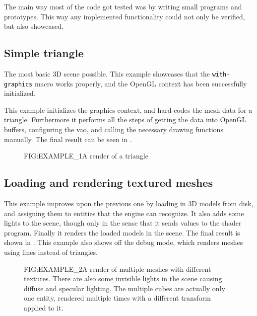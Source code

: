 

The main way most of the code got tested was by writing small programs and prototypes.
This way any implemented functionality could not only be verified,
but also showcased.

\subsection{Simple triangle}

The most basic 3D scene possible.
This example showcases that the \texttt{with-graphics} macro works properly,
and the OpenGL context has been successfully initialized.

This example initializes the graphics context,
and hard-codes the mesh data for a triangle.
Furthermore it performs all the steps of getting the data into OpenGL buffers,
configuring the \ac{vao},
and calling the necessary drawing functions manually.
The final result can be seen in .

\begin{figure}[Exploratory tests \textemdash\, Triangle]{FIG:EXAMPLE_1}{A render of a triangle}
\end{figure}

\subsection{Loading and rendering textured meshes}

This example improves upon the previous one by loading in 3D models from disk,
and assigning them to entities that the engine can recognize.
It also adds some lights to the scene,
though only in the sense that it sends values to the shader program.
Finally it renders the loaded models in the scene.
The final result is shown in .
This example also shows off the debug mode,
which renders meshes using lines instead of triangles.

\begin{figure}[Exploratory tests \textemdash\, Meshes]{FIG:EXAMPLE_2}{A render of multiple meshes with different textures. There are also some invisible lights in the scene causing diffuse and specular lighting. The multiple cubes are actually only one entity, rendered multiple times with a different transform applied to it.}
\end{figure}

